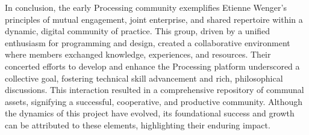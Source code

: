 In conclusion, the early Processing community exemplifies Etienne Wenger's principles of mutual engagement, joint enterprise, and shared repertoire within a dynamic, digital community of practice. This group, driven by a unified enthusiasm for programming and design, created a collaborative environment where members exchanged knowledge, experiences, and resources. Their concerted efforts to develop and enhance the Processing platform underscored a collective goal, fostering technical skill advancement and rich, philosophical discussions. This interaction resulted in a comprehensive repository of communal assets, signifying a successful, cooperative, and productive community. Although the dynamics of this project have evolved, its foundational success and growth can be attributed to these elements, highlighting their enduring impact.




%
%
%
%